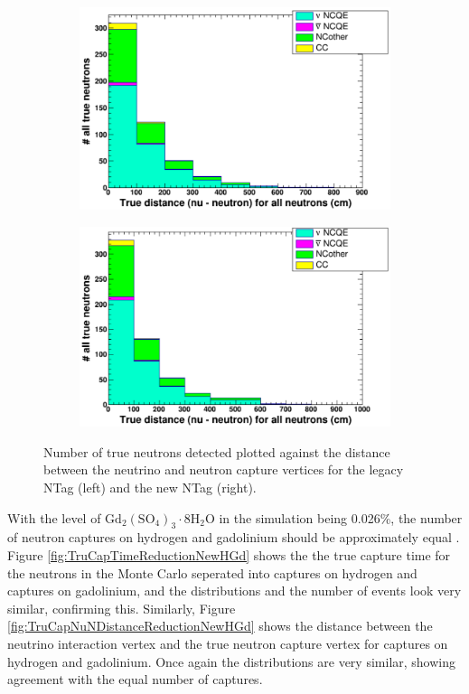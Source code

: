 \begin{figure}
    \centering
     \begin{subfigure}[b]{0.49\linewidth}
      \includegraphics[width=\linewidth]{Figures/TruCapNuNDistanceReductionLegacy.png}
     \end{subfigure}
     \begin{subfigure}[b]{0.49\linewidth}
       \includegraphics[width=\linewidth]{Figures/TruCapNuNDistanceReductionNew.png}
      \end{subfigure} 
      \caption{Number of true neutrons detected plotted against the distance between the neutrino and neutron capture vertices for the legacy NTag (left) and the new NTag (right).} 
      \label{fig:TruCapNuNDistanceReduction}
\end{figure}

With the level of $\mathrm{Gd}_{2}\left(\mathrm{SO}_{4}\right)_{3} \cdot 8 \mathrm{H}_{2} \mathrm{O}$ in the simulation being 0.026\%, the number of neutron captures on hydrogen and gadolinium should be approximately equal \cite{Sekiya_2020}. Figure \ref{fig:TruCapTimeReductionNewHGd} shows the the true capture time for the neutrons in the Monte Carlo seperated into captures on hydrogen and captures on gadolinium, and the distributions and the number of events look very similar, confirming this. Similarly, Figure \ref{fig:TruCapNuNDistanceReductionNewHGd} shows the distance between the neutrino interaction vertex and the true neutron capture vertex for captures on hydrogen and gadolinium. Once again the distributions are very similar, showing agreement with the equal number of captures.


